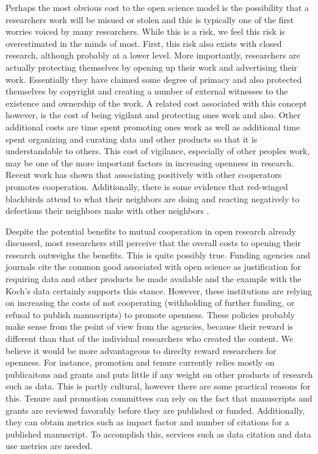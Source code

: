 \documentclass[11pt]{article} %
\begin{document}
Perhaps the most obvious cost to the open science model is the possibility that a researchers work will be misued or stolen and this is typically one of the first worries voiced by many researchers. While this is a risk, we feel this risk is overestimated in the minds of most. First, this risk also exists with closed research, although probably at a lower level. More importantly, researchers are actually protecting themselves by opening up their work and advertising their work. Essentially they have claimed some degree of primacy and also protected themselves by copyright and creating a number of external witnesses to the existence and ownership of the work. A related cost associated with this concept however, is the cost of being vigilant and protecting ones work and also. Other additional costs are time spent promoting ones work as well as additional time spent organizing and curating data and other products so that it is understandable to others. This cost of vigilance, especially of other peoples work, may be one of the more important factors in increasing openness in research. Recent work has shown that associating positively with other cooperators promotes cooperation. Additionally, there is some evidence that red-winged blackbirds attend to what their neighbors are doing and reacting negatively to defections their neighbors make with other neighbors \cite{olendorf_2004b}.

Despite the potential benefits to mutual cooperation in open research already discussed, most researchers still perceive that the overall costs to opening their research outweighs the benefits. This is quite possibly true. Funding agencies and journals cite the common good associated with open science as justification for requiring data and other products be made available and the example with the Koch's data certainly supports this stance. However, these institutions are relying on increasing the costs of not cooperating (withholding of further funding, or refusal to publish manuscripts) to promote openness. These policies probably make sense from the point of view from the agencies, because their reward is different than that of the individual researchers who created the content. We believe it would be more advantageous to direclty reward researchers for openness. For instance, promotion and tenure currently relies mostly on publicaitons and grants and puts little if any weight on other products of research such as data. This is partly cultural, however there are some practical reasons for this. Tenure and promotion committees can rely on the fact that manuscripts and grants are reviewed favorably before they are published or funded. Additionally, they can obtain metrics such as impact factor and number of citations for a published manuscript. To accomplish this, services such as data citation and data use metrics are needed.
\end{document}
